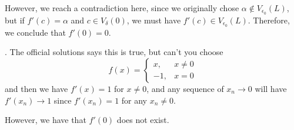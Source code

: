 {{However, we reach a contradiction here, since we originally chose 
$\alpha \not\in V_{\epsilon_0}(L)$, but if $f'(c) = \alpha$ and 
$c \in V_\delta(0)$, we must have $f'(c) \in V_{\epsilon_0}(L)$.
Therefore, we conclude that $f'(0) = 0$.

\item \TODO. The official solutions says this is true, 
but can't you choose 
\begin{equation*}
  f(x) = \begin{cases}
    x, &x \neq 0\\
    -1, &x = 0
  \end{cases}
\end{equation*}
and then we have $f'(x) = 1$ for $x \neq 0$, and any sequence of $x_n \to 0$
will have $f'(x_n) \to 1$ since $f'(x_n) = 1$ for any $x_n \neq 0$.

However, we have that $f'(0)$ does not exist.
}
}